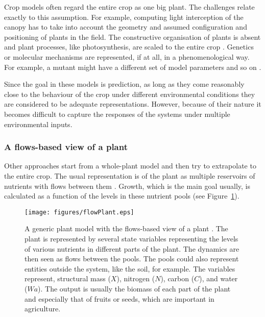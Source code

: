 Crop models often regard the entire crop as one big plant. The challenges
relate exactly to this assumption. For example, computing light interception of
the canopy has to take into account the geometry and assumed configuration and
positioning of plants in the field. The constructive organisation of plants is
absent and plant processes, like photosynthesis, are scaled to the entire crop
\citep{monteith_light_1965}. Genetics or molecular mechanisms are represented,
if at all, in a phenomenological way. For example, a mutant might have a
different set of model parameters and so on \citep{parent_can_2014}.

Since the goal in these models is prediction, as long as they come
reasonably close to the behaviour of the crop under different environmental
conditions they are considered to be adequate representations. However, because
of their nature it becomes difficult to capture the responses of the systems
under multiple environmental inputs.

\subsubsection*{A flows-based view of a plant}
Other approaches start from a whole-plant model and then try to extrapolate to
the entire crop. The usual representation is of the plant as multiple reservoirs
of nutrients with flows between them \citep{france_mathematical_1984}. Growth,
which is the main goal usually, is calculated as a function of the levels in
these nutrient pools (see Figure~\ref{fig:plantFlow}).

\begin{figure}[tb]
\centering  
\texttt{[image: figures/flowPlant.eps]}
\caption{A generic plant model with the flows-based view of a plant
  \citep[adapted from][]{france_mathematical_1984}. The plant is represented by several state
  variables representing the levels of various nutrients in different parts of
  the plant. The dynamics are then seen as flows between the pools. The pools
  could also represent entities outside the system, like the soil, for
  example. The variables represent, structural mass ($X$), nitrogen ($N$),
  carbon ($C$), and water ($Wa$). The output is usually the biomass of each part
  of the plant and especially that of fruits or seeds, which are important in
  agriculture.}
  \label{fig:plantFlow}
\end{figure}

